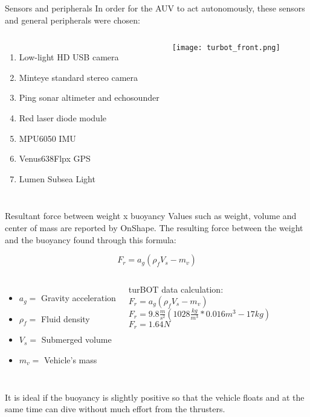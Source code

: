 \begin{frame}[c]{Sensors and peripherals}
  \transboxout[duration=0.5]
  In order for the AUV to act autonomously, these sensors and general peripherals were chosen:
  \begin{columns}
      \begin{enumerate}
        \item Low-light HD USB camera
        \item Minteye standard stereo camera
        \item Ping sonar altimeter and echosounder
        \item Red laser diode module
        \item MPU6050 IMU
        \item Venus638Flpx GPS
        \item Lumen Subsea Light
      \end{enumerate}
      \texttt{[image: turbot\_front.png]}      
  \end{columns}
\end{frame}


\begin{frame}[c]{Resultant force between weight x buoyancy}
  Values such as weight, volume and center of mass are reported by OnShape. The resulting force between the weight and the buoyancy found through this formula:
  
  \begin{equation} 
    F_{r} = a_{g}(\rho_{f} V_{s} - m_{v})
  \end{equation}
  \begin{columns}
      \begin{itemize}
        \item $a_{g} =$ Gravity acceleration
        \item $\rho_{f} =$ Fluid density
        \item $V_{s} =$ Submerged volume
        \item $m_{v} =$ Vehicle's mass
      \end{itemize}
      turBOT data calculation: \\
      $F_{r} = a_{g}(\rho_{f} V_{s} - m_{v})$ \\
      $F_{r} = 9.8 \frac{m}{s^2}(1028 \frac{kg}{m^3}* 0.016 m^3 - 17 kg)$ \\
      $F_{r} = 1.64 N$
  \end{columns}
  
  It is ideal if the buoyancy is slightly positive so that the vehicle floats and at the same time can dive without much effort from the thrusters.  
\end{frame}

